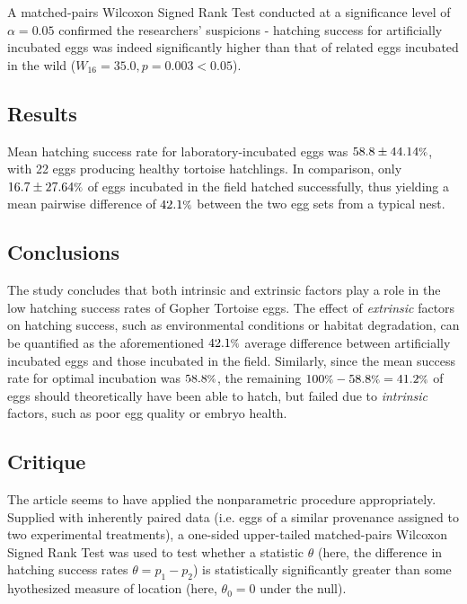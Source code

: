 \documentclass{article}
\newcommand*\pct{\scalebox{.85}{\%}}
\begin{document}
\begin{multicols}{2}
A matched-pairs Wilcoxon Signed Rank Test conducted at a significance level of $\alpha = 0.05$ confirmed the researchers' suspicions - hatching success for artificially incubated eggs was indeed significantly higher than that of related eggs incubated in the wild ($W_{16} = 35.0, p = 0.003 < 0.05$).

\subsection*{Results}

Mean hatching success rate for laboratory-incubated eggs was $58.8 \pm 44.14\pct$, with 22 eggs producing healthy tortoise hatchlings. In comparison, only $16.7 \pm 27.64\pct$ of eggs incubated in the field hatched successfully, thus yielding a mean pairwise difference of $42.1\pct$ between the two egg sets from a typical nest.

\subsection*{Conclusions}

The study concludes that both intrinsic and extrinsic factors play a role in the low hatching success rates of Gopher Tortoise eggs. The effect of \textit{extrinsic} factors on hatching success, such as environmental conditions or habitat degradation, can be quantified as the aforementioned $42.1\pct$ average difference between artificially incubated eggs and those incubated in the field. Similarly, since the mean success rate for optimal incubation was $58.8\pct$, the remaining $100\pct - 58.8\pct = 41.2\pct$ of eggs should theoretically have been able to hatch, but failed due to \textit{intrinsic} factors, such as poor egg quality or embryo health. 

\subsection*{Critique}

The article seems to have applied the nonparametric procedure appropriately. Supplied with inherently paired data (i.e. eggs of a similar provenance assigned to two experimental treatments), a one-sided upper-tailed matched-pairs Wilcoxon Signed Rank Test was used to test whether a statistic $\theta$ (here, the difference in hatching success rates $\theta = p_1 - p_2$) is statistically significantly greater than some hyothesized measure of location (here, $\theta_0 = 0$ under the null). 


\end{multicols}
\end{document}

